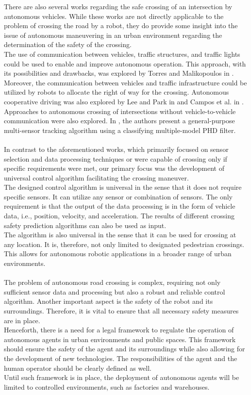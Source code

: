 There are also several works regarding the safe crossing of an intersection by autonomous vehicles. While these works are not directly applicable to the problem of crossing the road by a robot, they do provide some insight into the issue of autonomous maneuvering in an urban environment regarding the determination of the safety of the crossing.\\
The use of communication between vehicles, traffic structures, and traffic lights could be used to enable and improve autonomous operation. This approach, with its possibilities and drawbacks, was explored by Torres and Malikopoulos in \cite{CAV}. Moreover, the communication between vehicles and traffic infrastructure could be utilized by robots to allocate the right of way for the crossing. Autonomous cooperative driving was also explored by Lee and Park in \cite{Lee} and Campos et al. in \cite{Campos}.\\
Approaches to autonomous crossing of intersections without vehicle-to-vehicle communication were also explored. In \cite{CMMPHD}, the authors present a general-purpose multi-sensor tracking algorithm using a classifying multiple-model PHD filter.\\\\
In contrast to the aforementioned works, which primarily focused on sensor selection and data processing techniques or were capable of crossing only if specific requirements were met, our primary focus was the development of universal control algorithm facilitating the crossing maneuver.\\
The designed control algorithm is universal in the sense that it does not require specific sensors. It can utilize any sensor or combination of sensors. The only requirement is that the output of the data processing is in the form of vehicle data, i.e., position, velocity, and acceleration. The results of different crossing safety prediction algorithms can also be used as input.\\
The algorithm is also universal in the sense that it can be used for crossing at any location. It is, therefore, not only limited to designated pedestrian crossings. This allows for autonomous robotic applications in a broader range of urban environments.\\\\
The problem of autonomous road crossing is complex, requiring not only sufficient sensor data and processing but also a robust and reliable control algorithm. Another important aspect is the safety of the robot and its surroundings. Therefore, it is vital to ensure that all necessary safety measures are in place.\\
Henceforth, there is a need for a legal framework to regulate the operation of autonomous agents in urban environments and public spaces. This framework should ensure the safety of the agent and its surroundings while also allowing for the development of new technologies. The responsibilities of the agent and the human operator should be clearly defined as well.\\
Until such framework is in place, the deployment of autonomous agents will be limited to controlled environments, such as factories and warehouses.
